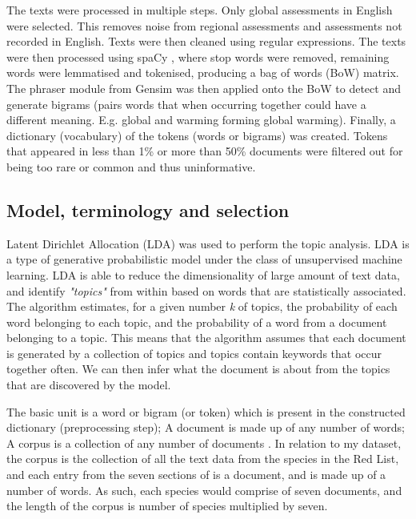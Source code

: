 The texts were processed in multiple steps. Only global assessments in English were selected. This removes noise from regional assessments and assessments not recorded in English. Texts were then cleaned using regular expressions. The texts were then processed using spaCy \parencite{spacy}, where stop words were removed, remaining words were lemmatised and tokenised, producing a bag of words (BoW) matrix. The phraser module from Gensim \parencite{rehurek_lrec} was then applied onto the BoW to detect and generate bigrams (pairs words that when occurring together could have a different meaning. E.g. global and warming forming global warming). Finally, a dictionary (vocabulary) of the tokens (words or bigrams) was created. Tokens that appeared in less than 1\% or more than 50\% documents were filtered out for being too rare or common and thus uninformative. 

\subsection{Model, terminology and selection}

Latent Dirichlet Allocation (LDA) \parencite{blei2003latent} was used to perform the topic analysis. LDA is a type of generative probabilistic model under the class of unsupervised machine learning. LDA is able to reduce the dimensionality of large amount of text data, and identify \textit{"topics"} from within based on words that are statistically associated. The algorithm estimates, for a given number \textit{k} of topics, the probability of each word belonging to each topic, and the probability of a word from a document belonging to a topic. This means that the algorithm assumes that each document is generated by a collection of topics and topics contain keywords that occur together often. We can then infer what the document is about from the topics that are discovered by the model.

The basic unit is a word or bigram (or token) which is present in the constructed dictionary (preprocessing step); A document is made up of any number of words; A corpus is a collection of any number of documents \parencite{blei2003latent}. In relation to my dataset, the corpus is the collection of all the text data from the species in the Red List, and each entry from the seven sections of is a document, and is made up of a number of words. As such, each species would comprise of seven documents, and the length of the corpus is number of species multiplied by seven.


